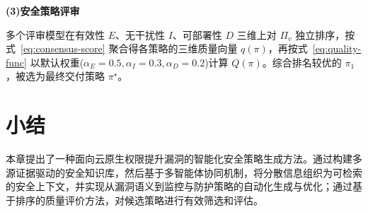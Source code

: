 \noindent\textbf{(3)安全策略评审}

多个评审模型在有效性 $E$、无干扰性 $I$、可部署性 $D$ 三维上对 $\Pi_v$ 独立排序，按式~\eqref{eq:consensus-score} 聚合得各策略的三维质量向量 $q(\pi)$，再按式~\eqref{eq:quality-func} 以默认权重($\alpha_E=0.5,\alpha_I=0.3,\alpha_D=0.2$)计算 $Q(\pi)$。综合排名较优的 $\pi_1$，被选为最终交付策略 $\pi^{\star}$。

\section{小结}
本章提出了一种面向云原生权限提升漏洞的智能化安全策略生成方法。通过构建多源证据驱动的安全知识库，然后基于多智能体协同机制，将分散信息组织为可检索的安全上下文，并实现从漏洞语义到监控与防护策略的自动化生成与优化；通过基于排序的质量评价方法，对候选策略进行有效筛选和评估。


